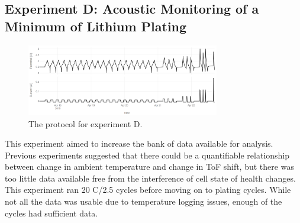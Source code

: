 \subsection{Experiment D: Acoustic Monitoring of a Minimum of Lithium Plating}
\begin{figure}[t]\label{fig:neware0417}
    \includegraphics[width=0.75\textwidth]{Thesis/neware0417.PNG}
    \centering
    \caption{The protocol for experiment D.}
\end{figure}
This experiment aimed to increase the bank of data available for analysis. Previous experiments suggested that there could be a quantifiable relationship between change in ambient temperature and change in ToF shift, but there was too little data available free from the interference of cell state of health changes. This experiment ran 20 C/2.5 cycles before moving on to plating cycles. While not all the data was usable due to temperature logging issues, enough of the cycles had sufficient data.